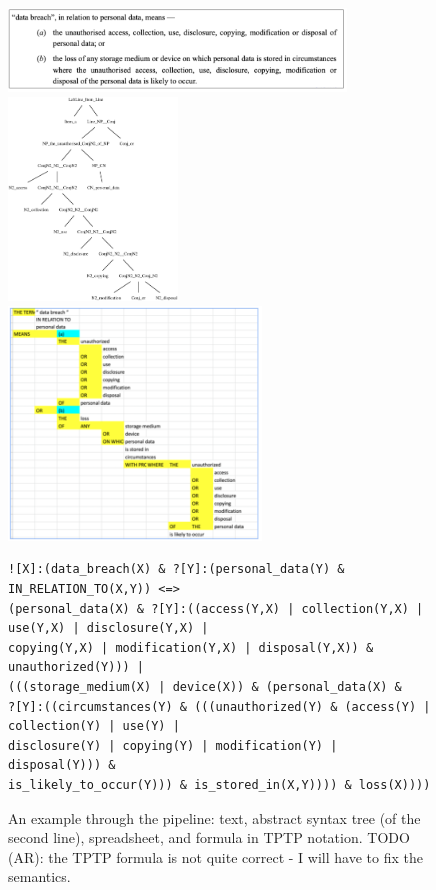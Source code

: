 \documentclass{IOS-Book-Article}
\begin{document}
\begin{figure}
\includegraphics[width=0.8\textwidth]{text.png}
\includegraphics[width=0.4\textwidth]{tree.eps}
\includegraphics[width=0.6\textwidth]{assembly.png}
\small
\begin{verbatim}
![X]:(data_breach(X) & ?[Y]:(personal_data(Y) & IN_RELATION_TO(X,Y)) <=> 
(personal_data(X) & ?[Y]:((access(Y,X) | collection(Y,X) | use(Y,X) | disclosure(Y,X) | 
copying(Y,X) | modification(Y,X) | disposal(Y,X)) & unauthorized(Y))) | 
(((storage_medium(X) | device(X)) & (personal_data(X) & 
?[Y]:((circumstances(Y) & (((unauthorized(Y) & (access(Y) | collection(Y) | use(Y) | 
disclosure(Y) | copying(Y) | modification(Y) | disposal(Y))) & 
is_likely_to_occur(Y))) & is_stored_in(X,Y)))) & loss(X))))
\end{verbatim}
\normalsize
\caption{An example through the pipeline: text, abstract syntax tree (of the second line), spreadsheet, and formula in TPTP notation.
TODO (AR): the TPTP formula is not quite correct - I will have to fix the semantics.
}
\label{pipeline-ex}
\end{figure}
\end{document}
